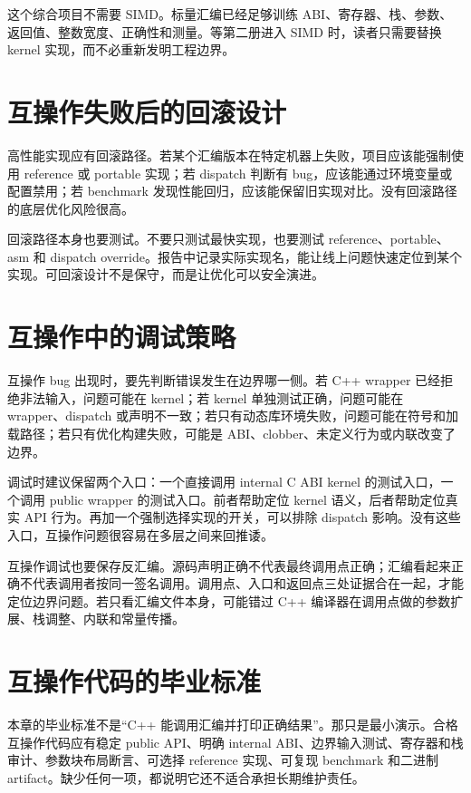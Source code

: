 这个综合项目不需要 SIMD。标量汇编已经足够训练 ABI、寄存器、栈、参数、返回值、整数宽度、正确性和测量。等第二册进入 SIMD 时，读者只需要替换 kernel 实现，而不必重新发明工程边界。

\section{互操作失败后的回滚设计}

高性能实现应有回滚路径。若某个汇编版本在特定机器上失败，项目应该能强制使用 reference 或 portable 实现；若 dispatch 判断有 bug，应该能通过环境变量或配置禁用；若 benchmark 发现性能回归，应该能保留旧实现对比。没有回滚路径的底层优化风险很高。

回滚路径本身也要测试。不要只测试最快实现，也要测试 reference、portable、asm 和 dispatch override。报告中记录实际实现名，能让线上问题快速定位到某个实现。可回滚设计不是保守，而是让优化可以安全演进。

\section{互操作中的调试策略}

互操作 bug 出现时，要先判断错误发生在边界哪一侧。若 C++ wrapper 已经拒绝非法输入，问题可能在 kernel；若 kernel 单独测试正确，问题可能在 wrapper、dispatch 或声明不一致；若只有动态库环境失败，问题可能在符号和加载路径；若只有优化构建失败，可能是 ABI、clobber、未定义行为或内联改变了边界。

调试时建议保留两个入口：一个直接调用 internal C ABI kernel 的测试入口，一个调用 public wrapper 的测试入口。前者帮助定位 kernel 语义，后者帮助定位真实 API 行为。再加一个强制选择实现的开关，可以排除 dispatch 影响。没有这些入口，互操作问题很容易在多层之间来回推诿。

互操作调试也要保存反汇编。源码声明正确不代表最终调用点正确；汇编看起来正确不代表调用者按同一签名调用。调用点、入口和返回点三处证据合在一起，才能定位边界问题。若只看汇编文件本身，可能错过 C++ 编译器在调用点做的参数扩展、栈调整、内联和常量传播。

\section{互操作代码的毕业标准}

本章的毕业标准不是“C++ 能调用汇编并打印正确结果”。那只是最小演示。合格互操作代码应有稳定 public API、明确 internal ABI、边界输入测试、寄存器和栈审计、参数块布局断言、可选择 reference 实现、可复现 benchmark 和二进制 artifact。缺少任何一项，都说明它还不适合承担长期维护责任。

